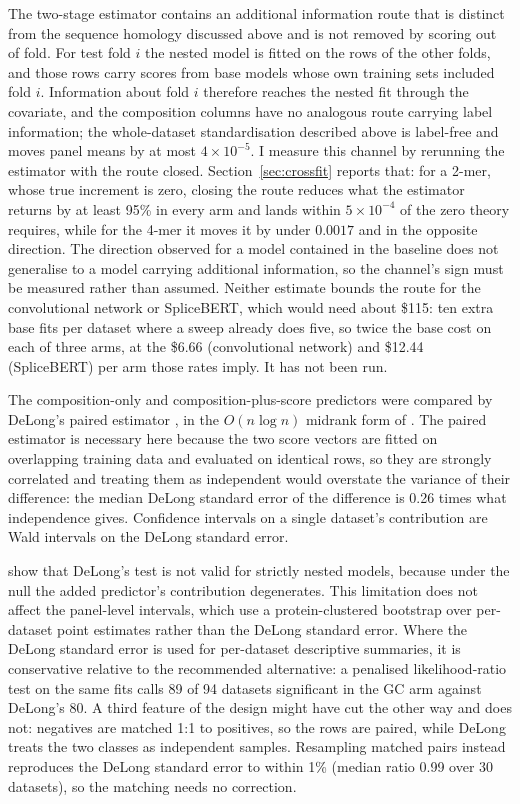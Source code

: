 The two-stage estimator contains an additional information route that is distinct from the
sequence homology discussed above and is not removed by scoring out of fold.
For test fold $i$ the nested model is fitted on the rows of the other folds, and those rows carry
scores from base models whose own training sets included fold $i$. Information about fold $i$
therefore reaches the nested fit through the covariate, and the composition columns have no
analogous route carrying label information; the whole-dataset standardisation described above
is label-free and moves panel means by at most $4\times10^{-5}$.
I measure this channel by rerunning the estimator with
the route closed. Section~\ref{sec:crossfit} reports that: for a 2-mer, whose true increment is
zero, closing the route reduces what the estimator returns by at least 95\% in every arm and
lands within $5\times10^{-4}$ of the zero theory requires, while for the 4-mer it moves it by
under $0.0017$ and in the opposite direction. The direction observed for a model contained in
the baseline does not generalise to a model carrying additional information, so the channel's
sign must be measured rather than assumed. Neither estimate bounds the route for the
convolutional network or SpliceBERT, which
would need about \$115: ten extra base fits per dataset where a sweep already does five, so twice the base cost on each of three arms, at the \$6.66 (convolutional network) and \$12.44 (SpliceBERT) per arm those rates imply. It has not been run.

The composition-only and composition-plus-score predictors were compared by DeLong's paired
estimator \citep{delong1988}, in the $O(n\log n)$ midrank form of \citet{sun2014}. The paired
estimator is necessary here because the two score vectors are fitted on overlapping training
data and evaluated on identical rows, so they are strongly correlated and treating them as
independent would overstate the variance of their difference: the median DeLong standard error
of the difference is 0.26 times what independence gives. Confidence intervals on a single
dataset's contribution are Wald intervals on the DeLong standard error.

\citet{demler2012} show that DeLong's test is not valid for strictly nested models, because
under the null the added predictor's contribution degenerates. This limitation does not affect
the panel-level intervals, which use a protein-clustered bootstrap over per-dataset point
estimates rather than the DeLong standard error. Where the DeLong standard error is used for
per-dataset descriptive summaries, it is
conservative relative to the recommended alternative: a penalised likelihood-ratio test on the
same fits calls 89 of 94 datasets significant in the GC arm against DeLong's 80. A third
feature of the design might have cut the other way and does not: negatives are matched 1:1 to
positives, so the rows are paired, while DeLong treats the two classes as independent samples.
Resampling matched pairs instead reproduces the DeLong standard error to within 1\% (median
ratio 0.99 over 30 datasets), so the matching needs no correction.

